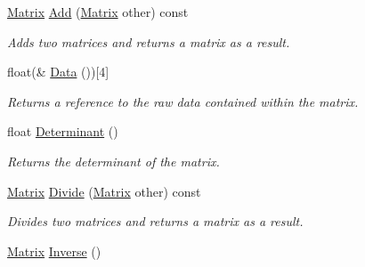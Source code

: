 \begin{DoxyCompactItemize}
\item 
\hypertarget{struct_jade_1_1_math_1_1_matrix_aa06e1c797c397f4ef041e0f1d9e5b572}{}\hyperlink{struct_jade_1_1_math_1_1_matrix}{Matrix} \hyperlink{struct_jade_1_1_math_1_1_matrix_aa06e1c797c397f4ef041e0f1d9e5b572}{Add} (\hyperlink{struct_jade_1_1_math_1_1_matrix}{Matrix} other) const \label{struct_jade_1_1_math_1_1_matrix_aa06e1c797c397f4ef041e0f1d9e5b572}

\begin{DoxyCompactList}\small\item\em Adds two matrices and returns a matrix as a result. \end{DoxyCompactList}\item 
\hypertarget{struct_jade_1_1_math_1_1_matrix_a23ed117800c7c6734930f84a7c864c1a}{}float(\& \hyperlink{struct_jade_1_1_math_1_1_matrix_a23ed117800c7c6734930f84a7c864c1a}{Data} ())\mbox{[}4\mbox{]}\label{struct_jade_1_1_math_1_1_matrix_a23ed117800c7c6734930f84a7c864c1a}

\begin{DoxyCompactList}\small\item\em Returns a reference to the raw data contained within the matrix. \end{DoxyCompactList}\item 
\hypertarget{struct_jade_1_1_math_1_1_matrix_a8b030138c16b571491ec6880269a9bed}{}float \hyperlink{struct_jade_1_1_math_1_1_matrix_a8b030138c16b571491ec6880269a9bed}{Determinant} ()\label{struct_jade_1_1_math_1_1_matrix_a8b030138c16b571491ec6880269a9bed}

\begin{DoxyCompactList}\small\item\em Returns the determinant of the matrix. \end{DoxyCompactList}\item 
\hypertarget{struct_jade_1_1_math_1_1_matrix_a6dff4eaa15baad168ba91920b1ceaf93}{}\hyperlink{struct_jade_1_1_math_1_1_matrix}{Matrix} \hyperlink{struct_jade_1_1_math_1_1_matrix_a6dff4eaa15baad168ba91920b1ceaf93}{Divide} (\hyperlink{struct_jade_1_1_math_1_1_matrix}{Matrix} other) const \label{struct_jade_1_1_math_1_1_matrix_a6dff4eaa15baad168ba91920b1ceaf93}

\begin{DoxyCompactList}\small\item\em Divides two matrices and returns a matrix as a result. \end{DoxyCompactList}\item 
\hypertarget{struct_jade_1_1_math_1_1_matrix_a922429ce3242f0df5d2987dfe7de238b}{}\hyperlink{struct_jade_1_1_math_1_1_matrix}{Matrix} \hyperlink{struct_jade_1_1_math_1_1_matrix_a922429ce3242f0df5d2987dfe7de238b}{Inverse} ()\label{struct_jade_1_1_math_1_1_matrix_a922429ce3242f0df5d2987dfe7de238b}


\end{DoxyCompactItemize}
